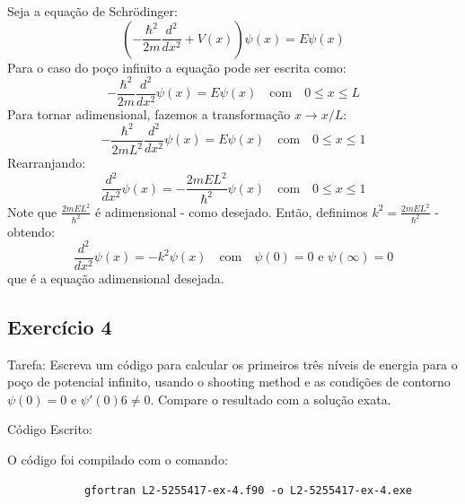 \documentclass[12pt, a4paper]{article} %
\begin{document}
        Seja a equação de Schr\"odinger:
        \begin{equation}
                \left(-\frac{\hbar^2}{2m}\frac{d^2}{dx^2} + V(x)\right)\psi(x) = E\psi(x)
        \end{equation}
        Para o caso do po\c{c}o infinito a equa\c{c}\~ao pode ser escrita como:
        \begin{equation}
                -\frac{\hbar^2}{2m}\frac{d^2}{dx^2}\psi(x) = E\psi(x) \quad \text{com} \quad 0 \leq x \leq L 
        \end{equation}
        Para tornar adimensional, fazemos a transforma\c{c}\~ao $x \longrightarrow x/L$:
        \begin{equation}
                -\frac{\hbar^2}{2mL^2}\frac{d^2}{dx^2}\psi(x) = E\psi(x) \quad \text{com} \quad 0 \leq x \leq 1
        \end{equation}
        Rearranjando:
        \begin{equation}
            \frac{d^2}{dx^2}\psi(x) = -\frac{2mEL^2}{\hbar^2}\psi(x) \quad \text{com} \quad 0 \leq x \leq 1
        \end{equation}
        Note que $\frac{2mEL^2}{\hbar^2}$ \'e adimensional - como desejado. Ent\~ao, definimos $k^2 = \frac{2mEL^2}{\hbar^2}$ - obtendo:
        \begin{equation}
            \frac{d^2}{dx^2}\psi(x) = -k^2\psi(x) \quad \text{com} \quad \psi(0) = 0 \text{ e } \psi(\infty) = 0
        \end{equation}
        que \'e a equa\c{c}\~ao adimensional desejada.


    \subsection{Exerc\'icio 4}

        Tarefa: Escreva um c\'odigo para calcular os primeiros tr\^es n\'iveis de energia para o po\c{c}o de potencial inﬁnito, usando o shooting method e as condi\c{c}\~oes de contorno $\psi(0) = 0$ e
        $\psi '(0) 6 \neq  0$. Compare o resultado com a solu\c{c}\~ao exata.

        C\'odigo Escrito:
        

        O c\'odigo foi compilado com o comando:
        \begin{verbatim}
            gfortran L2-5255417-ex-4.f90 -o L2-5255417-ex-4.exe
        \end{verbatim}
\end{document}
